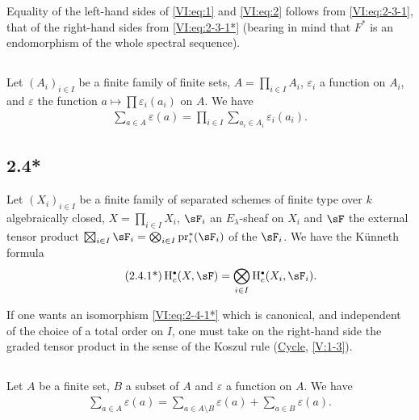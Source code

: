 Equality of the left-hand sides of \eqref{VI:eq:1} and \eqref{VI:eq:2}
follows from \eqref{VI:eq:2-3-1}, that of the right-hand sides from
\eqref{VI:eq:2-3-1*} (bearing in mind that $F^\ast$ is an endomorphism of
the whole spectral sequence). 





\subsection{}\label{VI:2-4}

Let $(A_i)_{i\in I}$ be a finite family of finite sets,
$A=\prod_{i\in I} A_i$, $\varepsilon_i$ a function on $A_i$, and
$\varepsilon$ the function $a\mapsto \prod \varepsilon_i(a_i)$ on $A$. We have 
\begin{align*}\tag{2.4.1}\label{VI:eq:2-4-1}
  \sum_{a\in A} \varepsilon(a) = \prod_{i\in I} \sum_{a_i\in A_i} \varepsilon_i(a_i) \text{.}
\end{align*}





\subsection*{2.4*}\label{VI:2-4*}

Let $(X_i)_{i\in I}$ be a finite family of separated schemes of finite type
over $k$ algebraically closed, $X=\prod_{i\in I} X_i$, $\sF_i$ an
$E_\lambda$-sheaf on $X_i$ and $\sF$ the external tensor product
$\bigboxtimes_{i\in I}\sF_i = \bigotimes_{i\in I} \pr_i^\ast(\sF_i)$
of the $\sF_i$. We have the K\"unneth formula 
\begin{align*}\tag{2.4.1*}\label{VI:eq:2-4-1*}
  \h_c^\bullet(X,\sF) = \bigotimes_{i\in I} \h_c^\bullet(X_i,\sF_i) \text{.}
\end{align*}

If one wants an isomorphism \eqref{VI:eq:2-4-1*} which is canonical, and independent of the
choice of a total order on $I$, one must take on the right-hand side the
graded tensor product in the sense of the Koszul rule
(\hyperref[IV]{Cycle}, \ref{V:1-3}). 





\subsection{}\label{VI:2-5}

Let $A$ be a finite set, $B$ a subset of $A$ and $\varepsilon$ a
function on $A$. We have 
\begin{align*}\tag{2.5.1}\label{VI:2-5-1}
  \sum_{a\in A} \varepsilon(a) = \sum_{a\in A\setminus B}\varepsilon(a) + \sum_{a\in B} \varepsilon(a) \text{.}
\end{align*}





